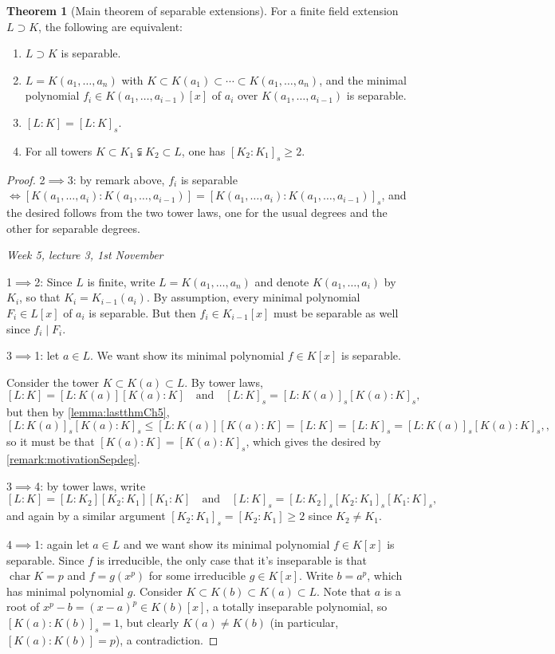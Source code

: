 \documentclass{article}
\newcommand{\Char}{\operatorname{char}}
\theoremstyle{definition}
\newtheorem{thm}[defn]{Theorem}
\begin{document}
\begin{thm}[Main theorem of separable extensions]
\label{thm:sepext}
For a finite field extension $L\supset K$, the following are equivalent:
\begin{enumerate}
\item $L\supset K$ is separable.
\item $L=K(a_1,\ldots,a_n)$ with $K\subset K(a_1)\subset\cdots\subset K(a_1,\ldots,a_n)$, and the minimal polynomial $f_i\in K(a_1,\ldots,a_{i-1})[x]$ of $a_i$ over $K(a_1,\ldots,a_{i-1})$ is separable.
\item $[L:K]=[L:K]_s$.
\item For all towers $K\subset K_1\subsetneqq K_2\subset L$, one has $[K_2:K_1]_s\geq 2$.
\end{enumerate}
\end{thm}
\begin{proof}
2$\implies$3: by remark above, $f_i$ is separable $\iff [K(a_1,\ldots,a_i):K(a_1,\ldots,a_{i-1})]=[K(a_1,\ldots,a_i):K(a_1,\ldots,a_{i-1})]_s$, and the desired follows from the two tower laws, one for the usual degrees and the other for separable degrees.

\begin{flushright}
\textit{Week 5, lecture 3, 1st November}
\end{flushright}

1$\implies$2: Since $L$ is finite, write $L=K(a_1,\ldots,a_n)$ and denote $K(a_1,\ldots,a_i)$ by $K_i$, so that $K_i=K_{i-1}(a_i)$. By assumption, every minimal polynomial $F_i\in L[x]$ of $a_i$ is separable. But then $f_i\in K_{i-1}[x]$ must be separable as well since $f_i\mid F_i$.

3$\implies $1: let $a\in L$. We want show its minimal polynomial $f\in K[x]$ is separable.

Consider the tower $K\subset K(a)\subset L$. By tower laws,
\[
[L:K]=[L:K(a)][K(a):K]\quad\text{and}\quad [L:K]_s=[L:K(a)]_s[K(a):K]_s,
\]
but then by \ref{lemma:lastthmCh5},
\[
[L:K(a)]_s[K(a):K]_s\leq [L:K(a)][K(a):K]=[L:K]=[L:K]_s=[L:K(a)]_s[K(a):K]_s,,
\]
so it must be that $[K(a):K]=[K(a):K]_s$, which gives the desired by \ref{remark:motivationSepdeg}.

3$\implies$4: by tower laws, write
\[
[L:K]=[L:K_2][K_2:K_1][K_1:K]\quad\text{and}\quad [L:K]_s=[L:K_2]_s[K_2:K_1]_s[K_1:K]_s,
\]
and again by a similar argument $[K_2:K_1]_s=[K_2:K_1]\geq 2$ since $K_2\neq K_1$.

4$\implies$1: again let $a\in L$ and we want show its minimal polynomial $f\in K[x]$ is separable. Since $f$ is irreducible, the only case that it's inseparable is that $\Char K=p$ and $f=g(x^p)$ for some irreducible $g\in K[x]$. Write $b=a^p$, which has minimal polynomial $g$. Consider $K\subset K(b)\subset K(a)\subset L$. Note that $a$ is a root of $x^p-b=(x-a)^p\in K(b)[x]$, a totally inseparable polynomial, so $[K(a):K(b)]_s=1$, but clearly $K(a)\neq K(b)$ (in particular, $[K(a):K(b)]=p$), a contradiction.
\end{proof}
\end{document}

